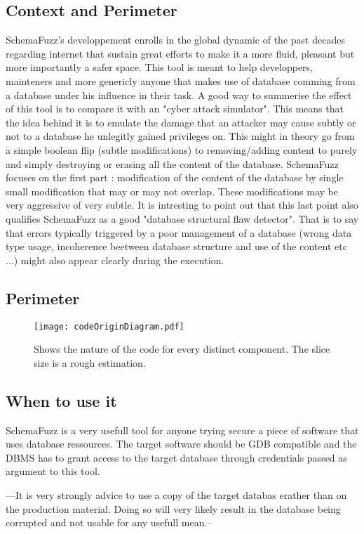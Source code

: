 \documentclass{article}
\begin{document}
\begin{empfile}
	\section{Context and Perimeter}
SchemaFuzz's developpement enrolls in the global dynamic of the past decades regarding internet  that sustain great efforts to make it a more fluid, pleasant but more importantly a safer space. This tool is meant to help developpers, mainteners and more genericly anyone that makes use of database comming from a database under his influence in their task. A good way to summerise the effect of this tool is to compare it with an "cyber attack simulator".
This means that the idea behind it is to emulate the damage that an attacker may cause subtly or not to a database he unlegitly gained privileges on. This might in theory go from a simple boolean flip (subtle modifications) to removing/adding content to purely and simply destroying or erasing all the content of the database.
SchemaFuzz focuses on the first part : modification of the content of the database by single small modification that may or may not overlap. These modifications may be very aggressive of very subtle.
It is intresting to point out that this last point also qualifies SchemaFuzz as a good "database structural flaw detector".
That is to say that errors typically triggered by a poor management of a database (wrong data type usage, incoherence beetween database structure and use of the content etc ...) might also appear clearly during the execution.   
		\subsection{Perimeter}
		\begin{figure} [htbp]
		\centering
		\texttt{[image: codeOriginDiagram.pdf]}
		\caption{Shows the nature of the code for every distinct component. The slice size is a rough estimation.}
		\end{figure}
		\subsection{When to use it}
SchemaFuzz is a very usefull tool for anyone trying secure a piece of software that uses database ressources. The target software should be GDB compatible and the DBMS has to grant access to the target database through credentials passed as argument to this tool.

---It is very strongly advice to use a copy of the target databas erather than on the production material. Doing so will very likely result in the database being corrupted and not usable for any usefull mean.--
 

\end{empfile}
\end{document}
